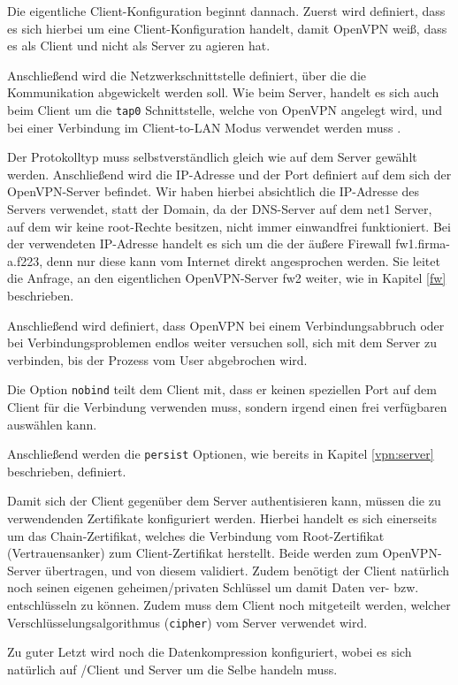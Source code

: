 Die eigentliche Client-Konfiguration beginnt dannach. Zuerst wird definiert, dass es sich hierbei um eine Client-Konfiguration handelt, damit OpenVPN weiß, dass es als Client und nicht als Server zu agieren hat.

Anschließend wird die Netzwerkschnittstelle definiert, über die die Kommunikation abgewickelt werden soll. Wie beim Server, handelt es sich auch beim Client um die \texttt{tap0} Schnittstelle, welche von OpenVPN angelegt wird, und bei einer Verbindung im Client-to-LAN Modus verwendet werden muss \cite{OpenVPN}.

Der Protokolltyp muss selbstverständlich gleich wie auf dem Server gewählt werden. Anschließend wird die IP-Adresse und der Port definiert auf dem sich der OpenVPN-Server befindet. Wir haben hierbei absichtlich die IP-Adresse des Servers verwendet, statt der Domain, da der DNS-Server auf dem net1 Server, auf dem wir keine root-Rechte besitzen, nicht immer einwandfrei funktioniert. Bei der verwendeten IP-Adresse handelt es sich um die der äußere Firewall fw1.firma-a.f223, denn nur diese kann vom Internet direkt angesprochen werden. Sie leitet die Anfrage, an den eigentlichen OpenVPN-Server fw2 weiter, wie in Kapitel \ref{fw} beschrieben.

Anschließend wird definiert, dass OpenVPN bei einem Verbindungsabbruch oder bei Verbindungsproblemen endlos weiter versuchen soll, sich mit dem Server zu verbinden, bis der Prozess vom User abgebrochen wird.

Die Option \texttt{nobind} teilt dem Client mit, dass er keinen speziellen Port auf dem Client für die Verbindung verwenden muss, sondern irgend einen frei verfügbaren auswählen kann.

Anschließend werden die \texttt{persist} Optionen, wie bereits in Kapitel \ref{vpn:server} beschrieben, definiert.

Damit sich der Client gegenüber dem Server authentisieren kann, müssen die zu verwendenden Zertifikate konfiguriert werden. Hierbei handelt es sich einerseits um das Chain-Zertifikat, welches die Verbindung vom Root-Zertifikat (Vertrauensanker) zum Client-Zertifikat herstellt. Beide werden zum OpenVPN-Server übertragen, und von diesem validiert. Zudem benötigt der Client natürlich noch seinen eigenen geheimen/privaten Schlüssel um damit Daten ver- bzw. entschlüsseln zu können. Zudem muss dem Client noch mitgeteilt werden, welcher Verschlüsselungsalgorithmus (\texttt{cipher}) vom Server verwendet wird.

Zu guter Letzt wird noch die Datenkompression konfiguriert, wobei es sich natürlich auf /Client und Server um die Selbe handeln muss.

